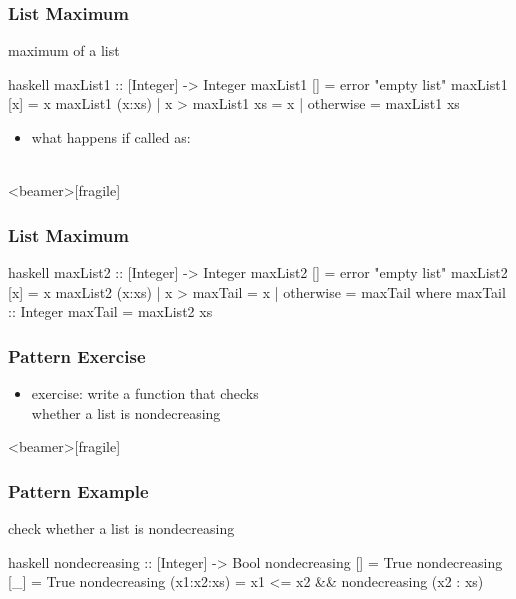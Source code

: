 \documentclass[dvipsnames]{beamer}
\theoremstyle{plain}
\begin{document}
\begin{frame}[fragile]
  \frametitle{List Maximum}

  \begin{exampleblock}{maximum of a list}
    \begin{pygments}{haskell}
maxList1 :: [Integer] -> Integer
maxList1 [] = error "empty list"
maxList1 [x] = x
maxList1 (x:xs)
  | x > maxList1 xs = x
  | otherwise       = maxList1 xs
    \end{pygments}
  \end{exampleblock}

  \pause
  \begin{itemize}
    \item what happens if called as:\\
      \\
  \end{itemize}
\end{frame}

\begin{frame}<beamer>[fragile]
  \frametitle{List Maximum}

  \begin{exampleblock}{}
    \begin{pygments}{haskell}
maxList2 :: [Integer] -> Integer
maxList2 [] = error "empty list"
maxList2 [x] = x
maxList2 (x:xs)
  | x > maxTail = x
  | otherwise   = maxTail
  where
    maxTail :: Integer
    maxTail = maxList2 xs
    \end{pygments}
  \end{exampleblock}
\end{frame}

\begin{frame}
  \frametitle{Pattern Exercise}

  \begin{itemize}
    \item exercise: write a function that checks\\
      whether a list is nondecreasing
  \end{itemize}
\end{frame}

\begin{frame}<beamer>[fragile]
  \frametitle{Pattern Example}

  \begin{exampleblock}{check whether a list is nondecreasing}
    \begin{pygments}{haskell}
nondecreasing :: [Integer] -> Bool
nondecreasing [] = True
nondecreasing [_] = True
nondecreasing (x1:x2:xs) = x1 <= x2
                        && nondecreasing (x2 : xs)
    \end{pygments}
  \end{exampleblock}
\end{frame}
\end{document}
